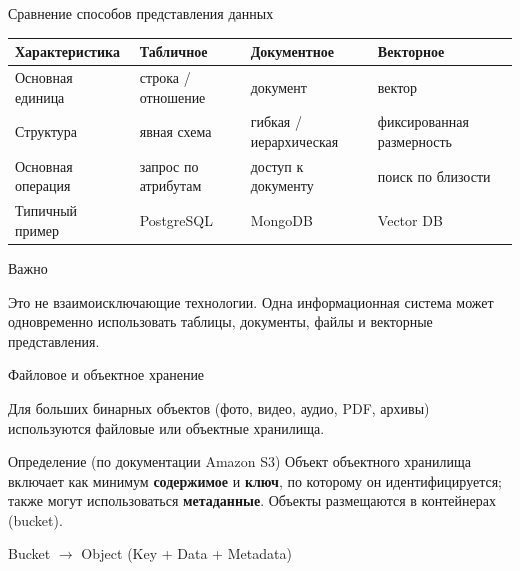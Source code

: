 \documentclass[aspectratio=169]{beamer}
\begin{document}
\begin{frame}{Сравнение способов представления данных}

\small

\begin{table}

\centering

\begin{tabular}{p{}|p{}|p{}|p{}}

\toprule

Характеристика &
Табличное &
Документное &
Векторное \\

\midrule

Основная единица &
строка /
отношение &
документ &
вектор \\

Структура &
явная схема &
гибкая /
иерархическая &
фиксированная
размерность \\

Основная операция &
запрос по атрибутам &
доступ к документу &
поиск по близости \\

Типичный пример &
PostgreSQL &
MongoDB &
Vector DB \\

\bottomrule

\end{tabular}

\end{table}

\vspace{0.3cm}

\begin{alertblock}{Важно}

Это не взаимоисключающие технологии. Одна информационная система может одновременно использовать таблицы, документы, файлы и векторные представления.

\end{alertblock}

\end{frame}


\begin{frame}{Файловое и объектное хранение}

Для больших бинарных объектов (фото, видео, аудио, PDF,
архивы) используются файловые или объектные хранилища.

\vspace{0.3cm}

\begin{block}{Определение (по документации Amazon S3)}
Объект объектного хранилища включает как минимум
\textbf{содержимое} и \textbf{ключ}, по которому он
идентифицируется; также могут использоваться
\textbf{метаданные}. Объекты размещаются в контейнерах
(bucket).
\end{block}

\vspace{0.3cm}

\begin{center}
Bucket $\rightarrow$ Object (Key + Data + Metadata)
\end{center}

\end{frame}
\end{document}
